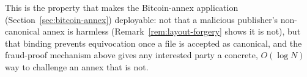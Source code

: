 This is the property that makes the Bitcoin-annex application
(Section~\ref{sec:bitcoin-annex}) deployable: not that a malicious
publisher's non-canonical annex is harmless (Remark~\ref{rem:layout-forgery}
shows it is not), but that binding prevents equivocation once a file is
accepted as canonical, and the fraud-proof mechanism above gives any
interested party a concrete, $O(\log N)$ way to challenge an annex that is
not.
